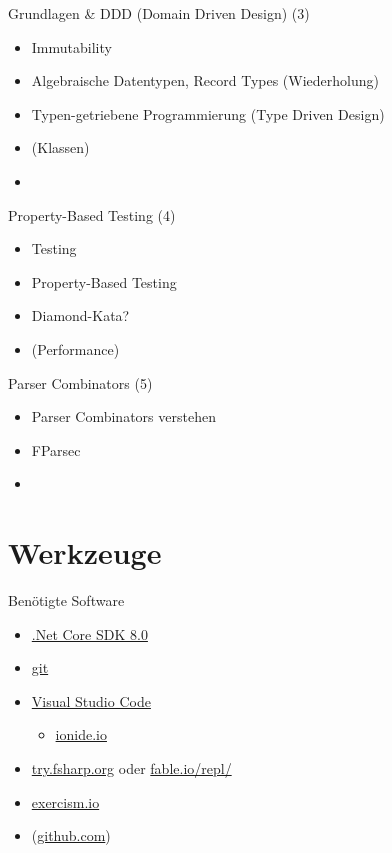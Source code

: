 \documentclass[t]{beamer}
\begin{document}
\begin{frame}[label={sec:org2f95d98}]{Grundlagen \& DDD (Domain Driven Design) (3)}
\begin{itemize}
\item Immutability
\item Algebraische Datentypen, Record Types (Wiederholung)
\item Typen-getriebene Programmierung (Type Driven Design)
\item (Klassen)
\item\relax [Programmieraufgabe!]
\end{itemize}
\end{frame}

\begin{frame}[label={sec:org8070232}]{Property-Based Testing (4)}
\begin{itemize}
\item Testing
\item Property-Based Testing
\item Diamond-Kata?
\item (Performance)
\end{itemize}
\end{frame}

\begin{frame}[label={sec:org62709a1}]{Parser Combinators (5)}
\begin{itemize}
\item Parser Combinators verstehen
\item FParsec
\item\relax [Test!]
\end{itemize}
\end{frame}


\section{Werkzeuge }
\label{sec:orgd4c8531}

\begin{frame}[label={sec:orgef5398e}]{Benötigte Software}
\begin{itemize}
\item \href{https://dotnet.microsoft.com/download}{.Net Core SDK 8.0}
\item \href{https://git-scm.com/}{git}
\item \href{https://code.visualstudio.com/}{Visual Studio Code}
\begin{itemize}
\item \href{http://ionide.io/}{ionide.io}
\end{itemize}
\item \href{https://try.fsharp.org/}{try.fsharp.org} oder \href{https://fable.io/repl/}{fable.io/repl/}
\item \href{https://exercism.io/}{exercism.io}
\item (\href{https://github.com/}{github.com})
\end{itemize}
\end{frame}
\end{document}
